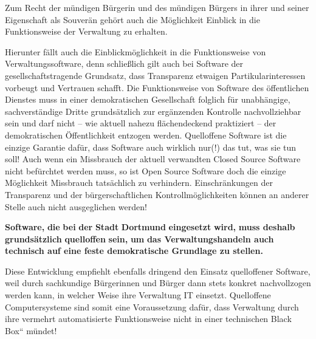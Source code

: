 \documentclass[a4paper]{article}
\begin{document}
\bigskip

{
Zum Recht der m\"undigen B\"urgerin und des m\"undigen B\"urgers in
ihrer und seiner Eigenschaft als Souver\"an geh\"ort auch die
M\"oglichkeit Einblick in die Funktionsweise der Verwaltung zu
erhalten.}

{
Hierunter f\"allt auch die Einblickm\"oglichkeit in die Funktionsweise
von Verwaltungssoftware, denn schlie{\ss}lich gilt auch bei Software
der gesellschaftstragende Grundsatz, dass Transparenz etwaigen
Partikularinteressen vorbeugt und Vertrauen schafft. Die Funktionsweise
von Software des \"offentlichen Dienstes muss in einer demokratischen
Gesellschaft folglich f\"ur unabh\"angige, sachverst\"andige Dritte
grunds\"atzlich zur erg\"anzenden Kontrolle nachvollziehbar sein und
darf nicht -- wie aktuell nahezu fl\"achendeckend praktiziert -- der
demokratischen \"Offentlichkeit entzogen werden. Quelloffene Software
ist die einzige Garantie daf\"ur, dass Software auch wirklich nur(!)
das tut, was sie tun soll! Auch wenn ein Missbrauch der aktuell
verwandten Closed Source Software nicht bef\"urchtet werden muss, so
ist Open Source Software doch die einzige M\"oglichkeit Missbrauch
tats\"achlich zu verhindern. Einschr\"ankungen der Transparenz und der
b\"urgerschaftlichen Kontrollm\"oglichkeiten k\"onnen an anderer Stelle
auch nicht ausgeglichen werden!}


\bigskip

{
\textbf{Software,}\textbf{ }\textbf{die}\textbf{ }\textbf{bei}\textbf{
}\textbf{der}\textbf{ }\textbf{Stadt}\textbf{
}\textbf{Dortmund}\textbf{ }\textbf{eingesetzt}\textbf{
}\textbf{wird,}\textbf{ muss deshalb }\textbf{grunds\"atzlich}\textbf{
}\textbf{quelloffen}\textbf{ sei}\textbf{n,}\textbf{
}\textbf{um}\textbf{ das Verwaltungshandeln auch technisch auf eine
feste demokratische Grundlage zu stellen.}}


{
Diese Entwicklung empfiehlt ebenfalls dringend den Einsatz quelloffener
Software, weil durch sachkundige B\"urgerinnen und B\"urger dann stets
konkret nachvollzogen werden kann, in welcher Weise ihre Verwaltung IT
einsetzt. Quelloffene Computersysteme sind somit eine Voraussetzung
daf\"ur, dass Verwaltung durch ihre vermehrt automatisierte
Funktionsweise nicht in einer technischen {\quotedblbase}Black
Box{\textquotedblleft} m\"undet!}
\end{document}
